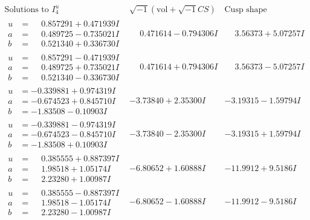 \documentclass[1p]{elsarticle_modified}
\theoremstyle{definition}
\newcommand{\I}{\sqrt{-1}}
\begin{document}
$$\begin{array}{c|c|c}  
\text{Solutions to }I^u_{4}& \I (\text{vol} + \sqrt{-1}CS) & \text{Cusp shape}\\
 \hline 
\begin{aligned}
u &= \phantom{-}0.857291 + 0.471939 I \\
a &= \phantom{-}0.489725 - 0.735021 I \\
b &= \phantom{-}0.521340 + 0.336730 I\end{aligned}
 & \phantom{-}0.471614 - 0.794306 I & \phantom{-}3.56373 + 5.07257 I \\ \hline\begin{aligned}
u &= \phantom{-}0.857291 - 0.471939 I \\
a &= \phantom{-}0.489725 + 0.735021 I \\
b &= \phantom{-}0.521340 - 0.336730 I\end{aligned}
 & \phantom{-}0.471614 + 0.794306 I & \phantom{-}3.56373 - 5.07257 I \\ \hline\begin{aligned}
u &= -0.339881 + 0.974319 I \\
a &= -0.674523 + 0.845710 I \\
b &= -1.83508 - 0.10903 I\end{aligned}
 & -3.73840 + 2.35300 I & -3.19315 - 1.59794 I \\ \hline\begin{aligned}
u &= -0.339881 - 0.974319 I \\
a &= -0.674523 - 0.845710 I \\
b &= -1.83508 + 0.10903 I\end{aligned}
 & -3.73840 - 2.35300 I & -3.19315 + 1.59794 I \\ \hline\begin{aligned}
u &= \phantom{-}0.385555 + 0.887397 I \\
a &= \phantom{-}1.98518 + 1.05174 I \\
b &= \phantom{-}2.23280 + 1.00987 I\end{aligned}
 & -6.80652 + 1.60888 I & -11.9912 + 9.5186 I \\ \hline\begin{aligned}
u &= \phantom{-}0.385555 - 0.887397 I \\
a &= \phantom{-}1.98518 - 1.05174 I \\
b &= \phantom{-}2.23280 - 1.00987 I\end{aligned}
 & -6.80652 - 1.60888 I & -11.9912 - 9.5186 I \\ \hline\begin{aligned}

\end{aligned}
\end{array}$$
\end{document}
